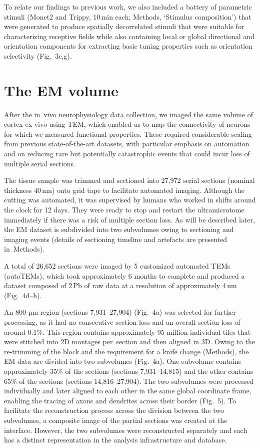 \documentclass{article}
\begin{document}
To relate our findings to previous work, we also included a battery of parametric stimuli (Monet2 and Trippy, 10\,min each; Methods, ‘Stimulus composition’) that were generated to produce spatially decorrelated stimuli that were suitable for characterizing receptive fields while also containing local or global directional and orientation components for extracting basic tuning properties such as orientation selectivity (Fig.~3e,g).

\section*{The EM volume}

After the in~vivo neurophysiology data collection, we imaged the same volume of cortex ex vivo using TEM, which enabled us to map the connectivity of neurons for which we measured functional properties. These required considerable scaling from previous state-of-the-art datasets, with particular emphasis on automation and on reducing rare but potentially catastrophic events that could incur loss of multiple serial sections.

The tissue sample was trimmed and sectioned into 27,972 serial sections (nominal thickness 40\,nm) onto grid tape to facilitate automated imaging. Although the cutting was automated, it was supervised by humans who worked in shifts around the clock for 12 days. They were ready to stop and restart the ultramicrotome immediately if there was a risk of multiple section loss. As will be described later, the EM dataset is subdivided into two subvolumes owing to sectioning and imaging events (details of sectioning timeline and artefacts are presented in~Methods).

A total of 26,652 sections were imaged by 5 customized automated TEMs (autoTEMs), which took approximately 6 months to complete and produced a dataset composed of 2\,Pb of raw data at a resolution of approximately 4\,nm (Fig.~4d–h).

An 800-µm region (sections 7,931–27,904) (Fig.~4a) was selected for further processing, as it had no consecutive section loss and an overall section loss of around 0.1\%. This region contains approximately 95 million individual tiles that were stitched into 2D montages per~section and then aligned in 3D. Owing to the re-trimming of the block and the requirement for a knife change (Methods), the EM data are divided into two subvolumes (Fig.~4a). One subvolume contains approximately 35\% of the sections (sections 7,931–14,815) and the other contains 65\% of the sections (sections 14,816–27,904). The two subvolumes were processed individually and later aligned to each other in the same global coordinate frame, enabling the tracing of axons and dendrites across their border (Fig.~5). To facilitate the reconstruction process across the division between the two subvolumes, a composite image of the partial sections was created at the interface. However, the two subvolumes were reconstructed separately and each has a distinct representation in the analysis infrastructure and database.
\end{document}

